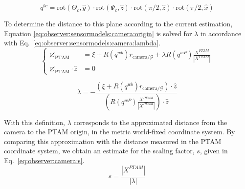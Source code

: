         \begin{equation}
        \label{eq:observer:sensormodels:qbc}
            q^{bc} = \text{rot}(\Theta_{c}, \hat{y}) \cdot \text{rot}(\Psi_{c}, \hat{z}) \cdot \text{rot}(\pi/2, \hat{z}) \cdot \text{rot}(\pi/2, \hat{x})
        \end{equation}

        To determine the distance to this plane according to the current estimation,
        Equation \eqref{eq:observer:sensormodels:camera:origin} is solved for $\lambda$
        in accordance with Eq.~\ref{eq:observer:sensormodels:camera:lambda}.
        \begin{equation}
            \label{eq:observer:sensormodels:camera:origin}
            \left\lbrace
            \begin{array}{ll}
                \varnothing_{\text{PTAM}} &= \xi + R(q^{wb}) r_{\text{camera}/\mathcal{G}} + \lambda R(q^{wP}) \frac{X^{PTAM}}{|X^{PTAM}|} \\
                \varnothing_{\text{PTAM}} \cdot \hat{z} &= 0
            \end{array}\right.
        \end{equation}

        \begin{equation}
            \label{eq:observer:sensormodels:camera:lambda}
            \lambda = -\frac{\left(\xi + R(q^{wb}) r_{\text{camera}/\mathcal{G}} \right) \cdot \hat{z}}{\left( R(q^{wP}) \frac{X^{PTAM}}{|X^{PTAM}|} \right) \cdot \hat{z}}
        \end{equation}



        With this definition, $\lambda$ corresponds to the approximated distance
        from the camera to the PTAM origin, in the metric world-fixed coordinate system.
        By comparing this approximation with the distance measured
        in the PTAM coordinate system, we obtain an estimate for the scaling factor, $s$, given
        in Eq.~\ref{eq:observer:camera:s}.
        \begin{equation}
        \label{eq:observer:camera:s}
            s = \frac{|X^{PTAM}|}{|\lambda|}
        \end{equation}

